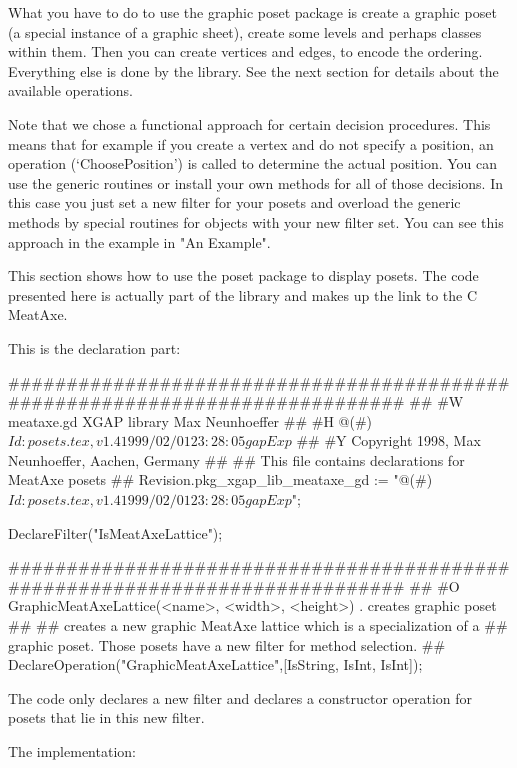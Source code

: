What you have to do to use the graphic poset package is create a graphic
poset (a special instance of a graphic sheet), create some levels and
perhaps classes within them. Then you can create vertices and edges, to
encode the ordering. Everything else is done by the library. See the next
section for details about the available operations.

Note that we chose a functional approach for certain decision
procedures. This means that for example if you create a vertex and do not
specify a position, an operation (`ChoosePosition') is called to determine
the actual position. You can use the generic routines or install your own
methods for all of those decisions. In this case you just set a new filter
for your posets and overload the generic methods by special routines for
objects with your new filter set. You can see this approach in the example
in "An Example".




This section shows how to use the poset package to display posets. The code
presented here is actually part of the {\XGAP} library and makes up the
link to the C MeatAxe.

This is the declaration part:

\beginexample
#############################################################################
##
#W  meataxe.gd                  XGAP library                  Max Neunhoeffer
##
#H  @(#)$Id: posets.tex,v 1.4 1999/02/01 23:28:05 gap Exp $
##
#Y  Copyright 1998,       Max Neunhoeffer,              Aachen,       Germany
##
##  This file contains declarations for MeatAxe posets
##
Revision.pkg_xgap_lib_meataxe_gd :=
    "@(#)$Id: posets.tex,v 1.4 1999/02/01 23:28:05 gap Exp $";

DeclareFilter("IsMeatAxeLattice");

#############################################################################
##
#O  GraphicMeatAxeLattice(<name>, <width>, <height>)  . creates graphic poset
##
##  creates a new graphic MeatAxe lattice which is a specialization of a
##  graphic poset. Those posets have a new filter for method selection.
##
DeclareOperation("GraphicMeatAxeLattice",[IsString, IsInt, IsInt]);
\endexample

The code only declares a new filter and declares a constructor operation
for posets that lie in this new filter.

The implementation:

